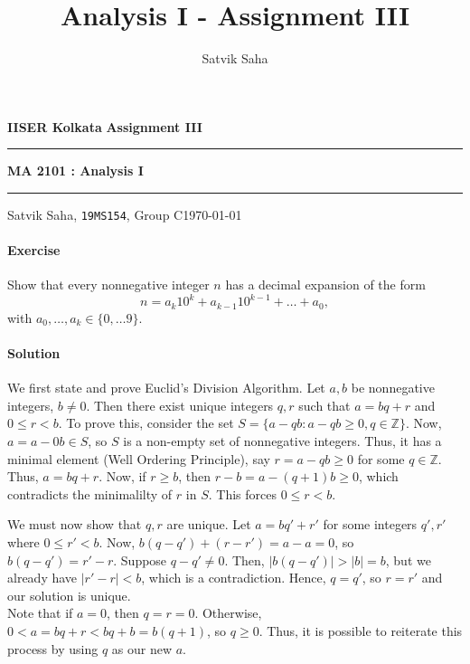 \documentclass[10pt]{article}
\title{Analysis I - Assignment III}
\author{Satvik Saha}
\date{}
\newcounter{prob}
\def\problem{\stepcounter{prob}\paragraph{Exercise \arabic{prob}}}
\def\solution{\paragraph{Solution}}
\begin{document}
        \par\textbf{IISER Kolkata} \hfill \textbf{Assignment III}
        \vspace{3pt}
        \hrule
        \vspace{3pt}
        \begin{center}
                \LARGE{\textbf{MA 2101 : Analysis I}}
        \end{center}
        \vspace{3pt}
        \hrule
        \vspace{3pt}
        Satvik Saha, \texttt{19MS154}, Group C\hfill\today
        \vspace{20pt}

        \problem Show that every nonnegative integer $n$ has a decimal expansion of the form
        \[
                n = a_k10^k + a_{k - 1}10^{k - 1} + \dots + a_0,
        \]
        with $a_0, \dots, a_k \in \{0, \dots 9\}$.

        \solution We first state and prove Euclid's Division Algorithm. Let $a, b$ be nonnegative integers, $b \neq 0$. Then there exist unique integers
        $q, r$ such that $a = bq + r$ and $0 \leq r < b$. To prove this, consider the set $S = \{a - qb : a - qb \geq 0, q \in \mathbb{Z}\}$.
        Now, $a = a - 0b \in S$, so $S$ is a non-empty set of nonnegative integers. Thus, it has a minimal element (Well Ordering Principle),
        say $r = a - qb \geq 0$ for some $q \in \mathbb{Z}$. Thus, $a = bq + r$. Now, if $r \geq b$, then $r - b = a - (q + 1)b \geq 0$,
        which contradicts the minimalilty of $r$ in $S$. This forces $0 \leq r < b$.

        We must now show that $q, r$ are unique. Let $a = bq' + r'$ for some integers $q', r'$ where $0 \leq r' < b$.
        Now, $b(q - q') + (r - r') = a - a = 0$, so $b(q - q') = r'- r$. Suppose $q - q' \neq 0$. Then, $|b(q - q')| > |b| = b$,
        but we already have $|r' - r| < b$, which is a contradiction. Hence, $q = q'$, so $r = r'$ and our solution is unique. \\

        Note that if $a = 0$, then $q = r = 0$. Otherwise, $0 < a = bq + r < bq + b = b(q + 1)$, so $q \geq 0$. Thus, it is possible to
        reiterate this process by using $q$ as our new $a$.\\
\end{document}
